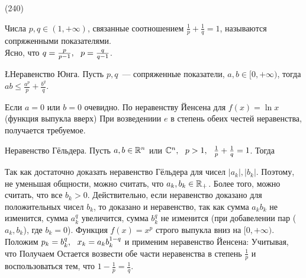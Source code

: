 (240)

\Op Числа $p, q \in (1, +\infty)$, связанные соотношением $\frac 1p + \frac 1q = 1$, называются сопряженными показателями.\\
Ясно, что $q = \frac{p}{p - 1},\ \  p = \frac q{q - 1}$.

\L \q Неравенство Юнга. Пусть $p, q$~--- сопряженные показатели, $a, b \in [0, +\infty)$, тогда $ab \le \frac{a^p}p + \frac{b^q}{q}$.

\D Если $a = 0$ или $b = 0$ очевидно. По неравенству Йенсена для $f(x) = \ln x$ (функция выпукла вверх)  При возведениии $e$ в степень обеих честей неравенства, получается требуемое.

\T \q Неравенство Гёльдера. Пусть $a, b \in\mathbb{R}^n$ или $\mathbb{C}^n,\ \  p > 1,\ \  \frac 1p + \frac 1q = 1$. Тогда 

\D Так как  достаточно доказать неравенство Гёльдера для чисел $|a_k|, |b_k|$. Поэтому, не уменьшая общности, можно считать, что $a_k, b_k \in \mathbb{R}_+$. Более того, можно считать, что все $b_k > 0$. Действительно, если неравенство доказано для положительных чисел $b_k$, то доказано и неравенство, так как сумма $a_k b_k$ не изменится, сумма $a^q_k$ увеличится, сумма $b^q_k$ не изменится (при добавелении пар ($a_k, b_k$), где $b_k = 0$).
Функция $f(x) = x^p$ строго выпукла вниз на $[0, +\infty)$. Положим $p_k = b^q_k,\ \  x_k = a_k b^{1-q}_k$ и применим неравенство Йенсена:  Учитывая, что  Получаем  Остается возвести обе части неравенства в степень $\frac 1p$ и воспользоваться тем, что $1 - \frac 1p = \frac 1q$.